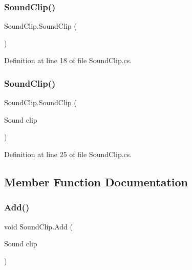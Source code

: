 \subsubsection{\texorpdfstring{Sound\+Clip()}{SoundClip()}\hspace{0.1cm}{\footnotesize\ttfamily [1/2]}}
{\footnotesize\ttfamily Sound\+Clip.\+Sound\+Clip (\begin{DoxyParamCaption}{ }\end{DoxyParamCaption})}



Definition at line 18 of file Sound\+Clip.\+cs.

\mbox{\label{class_sound_clip_a4f53d33b816b630b6dcf9f3aa2704f86}} 
\subsubsection{\texorpdfstring{Sound\+Clip()}{SoundClip()}\hspace{0.1cm}{\footnotesize\ttfamily [2/2]}}
{\footnotesize\ttfamily Sound\+Clip.\+Sound\+Clip (\begin{DoxyParamCaption}\item[{Sound}]{clip }\end{DoxyParamCaption})}



Definition at line 25 of file Sound\+Clip.\+cs.



\subsection{Member Function Documentation}
\mbox{\label{class_sound_clip_a52131a7c0ce75a4735b8fe7806b330c9}} 
\subsubsection{\texorpdfstring{Add()}{Add()}}
{\footnotesize\ttfamily void Sound\+Clip.\+Add (\begin{DoxyParamCaption}\item[{Sound}]{clip }\end{DoxyParamCaption})}



